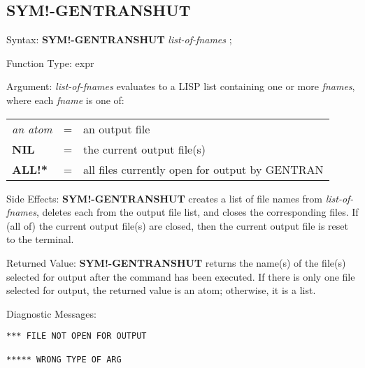\subsection{SYM!-GENTRANSHUT}
\begin{describe}{Syntax:}
{\bf SYM!-GENTRANSHUT} {\it list-of-fnames\/} ;
\end{describe} 
\begin{describe}{Function Type:}
expr
\end{describe} 
\begin{describe}{Argument:}
{\it list-of-fnames\/} evaluates to a LISP list containing one or more 
{\it fnames}, where each {\it fname\/} is one of:

\begin{tabular}{lll}
{\it an atom} & = &  an output file\\
{\bf NIL} & = & the current output file(s)\\
{\bf ALL!*} & = & all files currently open for output by GENTRAN\\
\end{tabular}
\end{describe} 
\begin{describe}{Side Effects:}
{\bf SYM!-GENTRANSHUT} creates a list of file names from {\it list-of-fnames},
deletes each from the output file list,
and closes the corresponding files.  If (all of) the
current output file(s) are closed, then the current output
file is reset to the terminal.
\end{describe} 
\begin{describe}{Returned Value:}
{\bf SYM!-GENTRANSHUT} returns the name(s) of the file(s) selected for
output after the command has been executed.  If there is
only one file selected for output, the returned value is an atom;
otherwise, it is a list.
\end{describe} 
\begin{describe}{Diagnostic Messages:}
\begin{verbatim}
*** FILE NOT OPEN FOR OUTPUT

***** WRONG TYPE OF ARG
\end{verbatim}
\end{describe} 

